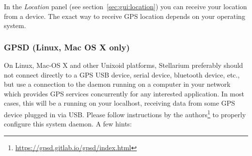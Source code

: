 \noindent In the \emph{Location} panel (see
section~\ref{sec:gui:location}) you can receive your location from a
 device.   The exact way to receive
GPS location depends on your operating system. 

\subsubsection{GPSD (Linux, Mac OS X only)}
\label{sec:ExtraData:GPS:GPSD}

On Linux, Mac-OS X and other Unixoid platforms, Stellarium preferably
should not connect directly to a GPS USB device, serial device,
bluetooth device, etc., but use a connection to the 
daemon running on a computer in your network which provides GPS
services concurrently for any interested application. In most cases,
this will be a  running on your localhost, receiving
data from some GPS device plugged in via USB.
Please follow instructions by the 
authors\footnote{\url{https://gpsd.gitlab.io/gpsd/index.html}} to properly
configure this system daemon.  A few hints:
